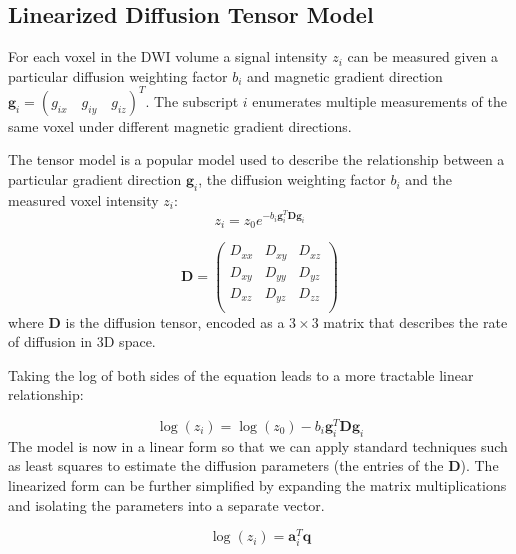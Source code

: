 \subsection{Linearized Diffusion Tensor Model}
For each voxel in the DWI volume a signal intensity $z_i$ can be measured given a particular diffusion weighting factor $b_i$ and magnetic gradient direction $\mathbf{g}_{i}=(g_{ix} \quad g_{iy} \quad g_{iz})^T$.  The subscript $i$ enumerates multiple measurements of the same voxel under different magnetic gradient directions.

The tensor model is a popular model used to describe the relationship between a particular gradient direction $\mathbf{g}_i$, the diffusion weighting factor $b_i$ and the measured voxel intensity $z_i$:  
%
%
\begin{equation} \label{eq:tensormodel}
z_{i}=z_0 e^{-b_i \mathbf{g}_i^T \mathbf{D} \mathbf{g}_i}
\end{equation}


\begin{equation} \label{eq:Dtensor}
\mathbf{D}=
\left( \begin{array}{ccc}
D_{xx} & D_{xy} & D_{xz} \\
D_{xy} & D_{yy} & D_{yz} \\
D_{xz} & D_{yz} & D_{zz} \\
\end{array} \right)
\end{equation}
%
%
where $\mathbf{D}$ is the diffusion tensor, encoded as a $3\times3$ matrix that describes the rate of diffusion in 3D space.  


Taking the log of both sides of the equation leads to a more tractable linear relationship:

\begin{equation} \label{eq:logtensormodel}
\log(z_i)=\log(z_0)-b_i \mathbf{g}_i^T \mathbf{D} \mathbf{g}_i
\end{equation}
%
%
The model is now in a linear form so that we can apply standard techniques such as least squares to estimate the diffusion parameters (the entries of the $\mathbf{D}$).  The linearized form can be further simplified by expanding the matrix multiplications and isolating the parameters into a separate vector.

\begin{equation} \label{eq:logtensormodelexpanded}
\log(z_i)=\mathbf{a}_i^T\mathbf{q}
\end{equation}

